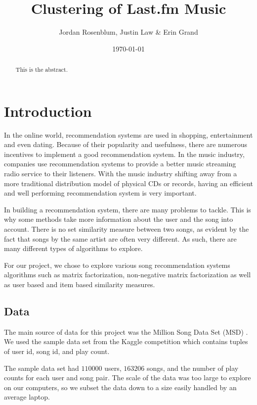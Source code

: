 \documentclass[12pt,preprint]{aastex}
\begin{document}
\title{Clustering of Last.fm Music}

 \author{Jordan Rosenblum, Justin Law \& Erin Grand}
 
\date{\today}             

\begin{abstract}
This is the abstract. 
\end{abstract}

\tableofcontents

\section{Introduction}
In the online world, recommendation systems are used in shopping, entertainment and even dating. 
Because of their popularity and usefulness, there are numerous incentives to implement a good recommendation system. 
In the music industry, companies use recommendation systems to provide a better music streaming radio service to their listeners. 
With the music industry shifting away from a more traditional distribution model of physical CDs or records, 
having an efficient and well performing recommendation system is very important. 

In building a recommendation system, there are many problems to tackle. This is why some methods take more information about the user and the song into account.
There is no set similarity measure between two songs, as evident by the fact that songs by the same artist are often very different. As such, there are many different types of algorithms to explore. 

For our project, we chose to explore various song recommendation systems algorithms such as matrix factorization, non-negative matrix factorization as well as user based and item based similarity measures.  

\subsection{Data}
The main source of data for this project was the Million Song Data Set (MSD)  \citep{Bertin-Mahieux2011}. We used the sample data set from the Kaggle competition which contains tuples of user id, song id, and play count.  

The sample data set had $110000$ users, $163206$ songs, and the number of play counts for each user and song pair.
The scale of the data was too large to explore on our computers, so we subset the data down to a size easily handled by an average laptop. 
\end{document}

